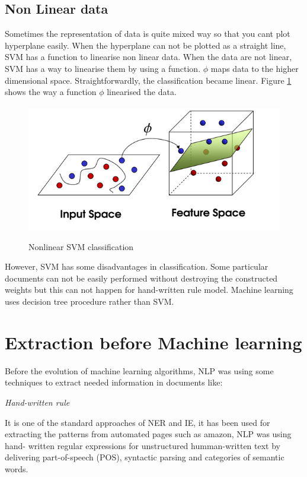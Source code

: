 \subsection{Non Linear data} 
Sometimes the representation of data is quite mixed way so that you cant plot hyperplane easily. When the hyperplane can not be plotted as a straight line,  SVM has a function to linearise non linear data.  When the data are not linear, SVM has a way to linearise them by using a function. $ \phi$ maps data to the higher dimensional space. Straightforwardly, the classification became linear. Figure \ref{SVMNL} shows the way a function $ \phi$ linearised the data.

\begin{figure}[hbtp]
\caption{Nonlinear SVM classification}
\centering
\includegraphics[scale=.7]{images/SVMNL.png}\label{SVMNL}
\end{figure}

However, SVM has some disadvantages in classification. Some particular documents can not be  easily performed without destroying the constructed weights  but this can not happen for  hand-written rule model. Machine learning uses decision tree procedure rather than  SVM.

\section{Extraction before Machine learning}
Before the evolution of machine learning algorithms, NLP was using some  techniques to extract needed information in documents like:

\textit{Hand-written rule}

It is one of the standard approaches of NER and IE, it has been used for extracting the patterns from automated pages such as amazon, NLP was using hand- written regular expressions for unstructured humman-written text by delivering  part-of-speech (POS), syntactic parsing and categories of semantic words.

